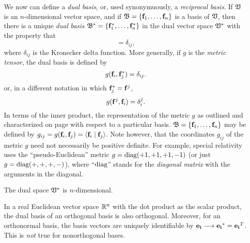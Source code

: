 We now can define a {\em dual basis}, or, used synonymuously, a {\em reciprocal basis}.
If ${\frak V}$ is an $n$-dimensional vector space, and if
${\frak B} = \{{\bf f}_1,\ldots , {\bf f}_n\}$
is a basis of  ${\frak V}$,
then there is a unique {\em dual basis}
${\frak B}^*
=\{{\bf f}_1^*,\ldots , {\bf f}_n^*\}$ in the dual vector space ${\frak V}^*$
with the property that
\begin{equation}
[{\bf f}_i,  {\bf f}_j^*]=\delta_{ij},
\label{2011-m-Dualbasis-e1}
\end{equation}
where  $\delta_{ij}$
is the Kronecker delta function.
More generally, if $g$ is the {\em metric tensor},
the dual basis is defined by
\begin{equation}
g( {\bf f}_i,{\bf f}_j^*)=\delta_{ij}.
\label{2011-m-Dualbasis-e2}
\end{equation}
or, in a different notation in which ${\bf f}_j^* = {\bf f}^j$,
\begin{equation}
g( {\bf f}^j,{\bf f}_i)=\delta_{i}^j.
\label{2011-m-Dualbasis-e3}
\end{equation}
In terms of the inner product, the representation
of the metric $g$ as outlined and characterized on page \pageref{2011-m-metrict} with respect to a particular basis.
${\frak B} = \{{\bf f}_1,\ldots , {\bf f}_n\}$
may be defined by $g_{ij}=g({\bf f}_i,{\bf f}_j)=\langle {\bf f}_i\mid {\bf f}_j\rangle$.
Note however, that the coordinates $g_{ij}$ of
the metric $g$ need not necessarily be positive definite.
For example,  special relativity uses the ``pseudo-Euclidean'' metric
 $g={\rm diag}(+1,+1,+1,-1)$ (or just $g={\rm diag}(+,+,+,-)$), where ``${\rm diag}$''
stands for the {\em diagonal matrix}
with the arguments in the diagonal.


The dual space  ${\frak V}^*$  is $n$-dimensional.

In a real Euclidean vector space ${\Bbb R}^n$
with the dot product as the scalar product,
the dual basis of an orthogonal basis  is also orthogonal.
Moreover, for an orthonormal basis, the basis vectors are uniquely identifiable by
${\bf e_i} \longrightarrow {\bf e_i}^* = {\bf e_i}^T$.
This is {\em not} true for nonorthogonal bases.

